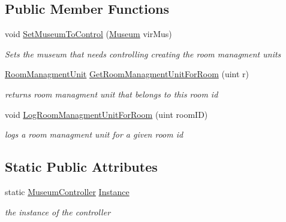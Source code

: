 \subsection*{Public Member Functions}
\begin{DoxyCompactItemize}
\item 
void \mbox{\hyperlink{class_museum_controller_a276d26ec047cda4e6f36b29fb673d968}{Set\+Museum\+To\+Control}} (\mbox{\hyperlink{class_museum}{Museum}} vir\+Mus)
\begin{DoxyCompactList}\small\item\em Sets the museum that needs controlling creating the room managment units \end{DoxyCompactList}\item 
\mbox{\hyperlink{class_room_managment_unit}{Room\+Managment\+Unit}} \mbox{\hyperlink{class_museum_controller_a430d02fd399da5cea23a02f4b9269418}{Get\+Room\+Managment\+Unit\+For\+Room}} (uint r)
\begin{DoxyCompactList}\small\item\em returns room managment unit that belongs to this room id \end{DoxyCompactList}\item 
void \mbox{\hyperlink{class_museum_controller_a56fa5cc287bbe98e48284641da456f61}{Log\+Room\+Managment\+Unit\+For\+Room}} (uint room\+ID)
\begin{DoxyCompactList}\small\item\em logs a room managment unit for a given room id \end{DoxyCompactList}\end{DoxyCompactItemize}
\subsection*{Static Public Attributes}
\begin{DoxyCompactItemize}
\item 
static \mbox{\hyperlink{class_museum_controller}{Museum\+Controller}} \mbox{\hyperlink{class_museum_controller_ab4bf6462a15c26e2acb9340ec207d9a6}{Instance}}
\begin{DoxyCompactList}\small\item\em the instance of the controller \end{DoxyCompactList}\end{DoxyCompactItemize}
